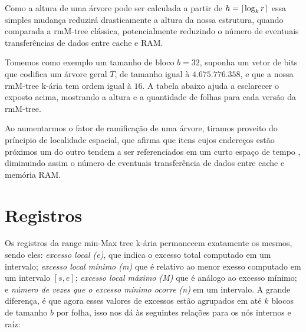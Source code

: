 Como a altura de uma árvore pode ser calculada a partir de $h = \lceil\log_k r\rceil$ essa simples mudança reduzirá drasticamente a altura da nossa estrutura,
quando comparada a rmM-tree clássica,  potencialmente reduzindo o número de eventuais transferências de dados entre cache e RAM.

Tomemos como exemplo um tamanho de bloco $b = 32$, suponha um vetor de bits que codifica um árvore geral $T$, de tamanho igual à  $4.675.776.358$, e que a nossa rmM-tree k-ária tem ordem igual à $16$. A tabela abaixo ajuda a esclarecer o exposto acima, mostrando a altura e a quantidade de folhas para cada versão da rmM-tree.


\begin{table}[h!]
    \centering
    \caption[Diferentes range min-Max tree sobree um conjunto de dados]{Altua e número de nós folhas para uma rmM-tree binária e k-ária}
    \label{tbl:dataset}
  \end{table}

 Ao aumentarmos o fator de ramificação de uma árvore, tiramos proveito do príncipio de localidade espacial, que afirma que itens cujos endereços estão próximos um do outro tendem a ser referenciados em um curto espaço de tempo \citep{book-computer-architecutre}, diminuindo assim o número de eventuais transferência de dados entre cache e memória RAM.
 
\section{Registros}
Os registros da range min-Max tree k-ária permanecem exatamente os mesmos, sendo eles: \textit{excesso local (e)}, que indica o excesso total  computado em um intervalo; \textit{excesso local mínimo (m)} que é relativo ao menor exesso computado em um intervalo $[s,e]$; \textit{excesso local máximo (M)} que é análogo ao excesso mínimo; e \textit{número de vezes que o excesso mínimo ocorre (n)} em um intervalo. A grande diferença, é que agora esses valores de excessos estão agrupados em até $k$ blocos de tamanho $b$ por folha, isso nos dá às seguintes relações para os nós internos e raíz:

